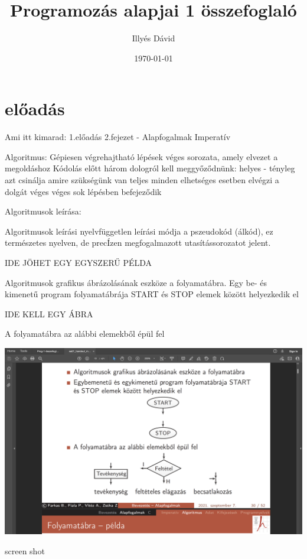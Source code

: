 \documentclass[12pt, a4paper]{article}
\title{Programozás alapjai 1 összefoglaló}
\author{Illyés Dávid}
\date{\today}
\begin{document}
\maketitle


\noindent{}


\section{előadás}

Ami itt kimarad:
1.előadás 2.fejezet - Alapfogalmak Imperatív

Algoritmus:
Gépiesen végrehajtható lépések véges sorozata, amely elvezet a megoldáshoz
Kódolás előtt három dologról kell meggyőződnünk:
helyes - tényleg azt csinálja amire szükségünk van
teljes minden elhetséges esetben elvégzi a dolgát
véges véges sok lépésben befejeződik

Algoritmusok leírása:

Algoritmusok leírási nyelvfüggetlen leírási módja a pszeudokód (álkód), ez természetes nyelven, de precÍzen megfogalmazott utasítássorozatot jelent.

 IDE JÖHET EGY EGYSZERŰ PÉLDA 

Algoritmusok grafikus ábrázolásának eszköze a folyamatábra.
Egy be- és kimenetű program folyamatábrája START és STOP  elemek között helyezkedik el

IDE KELL EGY ÁBRA 

A folyamatábra az alábbi elemekből épül fel


\includegraphics[scale= 0.2]{screen}
\caption{screen shot}
\end{document}
